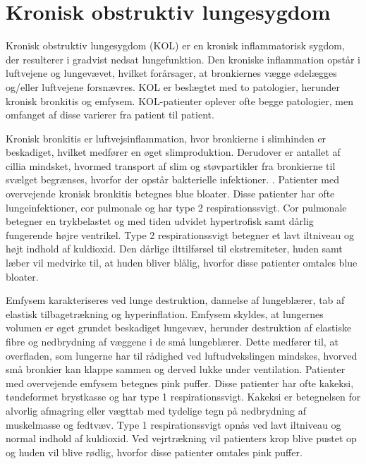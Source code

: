 \section{Kronisk obstruktiv lungesygdom}
Kronisk obstruktiv lungesygdom (KOL) er en kronisk inflammatorisk sygdom, der resulterer i gradvist nedsat lungefunktion. Den kroniske inflammation opstår i luftvejene og lungevævet, hvilket forårsager, at bronkiernes vægge ødelægges og/eller luftvejene forsnævres.\cite{Basisbogen2016} KOL er beslægtet med to patologier, herunder kronisk bronkitis og emfysem. KOL-patienter oplever ofte begge patologier, men omfanget af disse varierer fra patient til patient.\cite{Basisbogen2016,Healthguidances2016}

Kronisk bronkitis er luftvejsinflammation, hvor bronkierne i slimhinden er beskadiget, hvilket medfører en øget slimproduktion. Derudover er antallet af cillia mindsket, hvormed transport af slim og støvpartikler fra bronkierne til svælget begrænses, hvorfor der opstår bakterielle infektioner. \cite{Frausing2011, Britannica2016}. Patienter med overvejende kronisk bronkitis betegnes blue bloater. Disse patienter har ofte lungeinfektioner, cor pulmonale og har type 2 respirationssvigt. Cor pulmonale betegner en trykbelastet og med tiden udvidet hypertrofisk samt dårlig fungerende højre ventrikel. Type 2 respirationssvigt betegner et lavt iltniveau og højt indhold af kuldioxid. Den dårlige ilttilførsel til ekstremiteter, huden samt læber vil medvirke til, at huden bliver blålig, hvorfor disse patienter omtales blue bloater. \cite{Healthguidances2016}

Emfysem karakteriseres ved lunge destruktion, dannelse af lungeblærer, tab af elastisk tilbagetrækning og hyperinflation. Emfysem skyldes, at lungernes volumen er øget grundet beskadiget lungevæv, herunder destruktion af elastiske fibre og nedbrydning af væggene i de små lungeblærer. Dette medfører til, at overfladen, som lungerne har til rådighed ved luftudvekslingen mindskes, hvorved små bronkier kan klappe sammen og derved lukke under ventilation.\cite{Frausing2011a,Flaschen-Hansen2008} Patienter med overvejende emfysem betegnes pink puffer. Disse patienter har ofte kakeksi, tøndeformet brystkasse og har type 1 respirationssvigt. Kakeksi er betegnelsen for alvorlig afmagring eller vægttab med tydelige tegn på nedbrydning af muskelmasse og fedtvæv. Type 1 respirationssvigt opnås ved lavt iltniveau og normal indhold af kuldioxid. Ved vejrtrækning vil patienters krop blive pustet op og huden vil blive rødlig, hvorfor disse patienter omtales pink puffer.\cite{Healthguidances2016}

